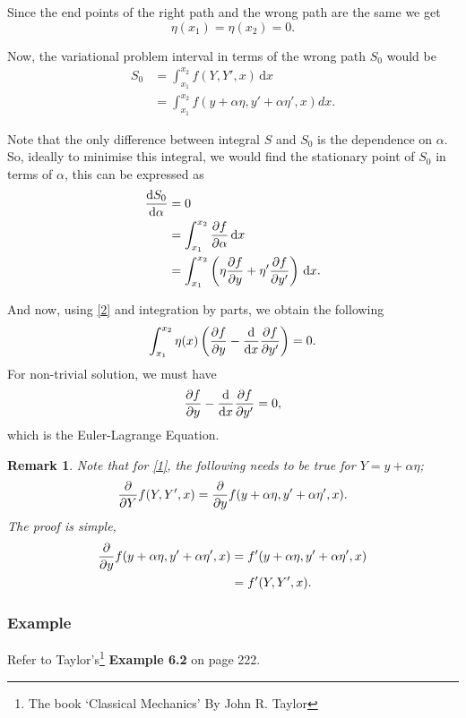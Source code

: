 \documentclass[12pt,english]{article}
\newcommand{\dmr}[1]{\, \mathrm{d}#1} %
\newcommand{\intt}[2]{\int_{#1}^{#2}} %
\newtheorem{remark}{Remark}[subsubsection]
\numberwithin{equation}{subsection}
\begin{document}
Since the end points of the right path and the wrong path are the same we get
\begin{equation}
    \eta(x_1) = \eta(x_2) = 0.\label{2}
\end{equation}

Now, the variational problem interval in terms of the wrong path $S_0$ would be
\begin{align}
    S_0 & = \intt{x_1}{x_2} f(Y,Y',x) \dmr{x} \nonumber               \\
        & = \intt{x_1}{x_2} f(y+\alpha \eta, y' + \alpha \eta', x)dx.
\end{align}

Note that the only difference between integral $S$ and $S_0$ is the dependence on $\alpha$. So, ideally to minimise this integral, we would find the stationary point of $S_0$ in terms of $\alpha$, this can be expressed as
\begin{align}
    \dv{S_0}{\alpha} & = 0 \nonumber                                                                         \\
                     & = \intt{x_1}{x_2} \pdv{f}{\alpha} \dmr{x} \nonumber                                   \\
                     & = \intt{x_1}{x_2} \left(\eta \pdv{f}{y} + \eta' \pdv{f}{y'} \right) \dmr{x}.\label{1}
\end{align}

And now, using \eqref{2} and integration by parts, we obtain the following
\begin{equation}
    \intt{x_1}{x_2}\eta(x)\left(\pdv{f}{y}-\dv{x}\pdv{f}{y'}\right) = 0.
\end{equation}
For non-trivial solution, we must have
\[
    \pdv{f}{y}-\dv{x}\pdv{f}{y'} = 0,
\]
which is the Euler-Lagrange Equation.

\begin{remark}
    Note that for \eqref{1}, the following needs to be true for $Y = y + \alpha \eta$;
    \[
        \pdv{}{Y} f(Y,Y',x) = \pdv{}{y} f(y+\alpha \eta, y'+\alpha \eta', x).
    \]
    The proof is simple,
    \begin{align*}
        \pdv{}{y} f(y+\alpha \eta, y'+\alpha \eta', x) & = f'(y+\alpha \eta, y'+\alpha \eta', x) \\
                                                       & = f'(Y, Y', x).
    \end{align*}
\end{remark}

\subsubsection{Example}
Refer to Taylor's\footnote{The book `Classical Mechanics'\cite{TaylorJohnR.JohnRobert2005Cm} By John R. Taylor} \textbf{Example 6.2} on page 222.
\end{document}
